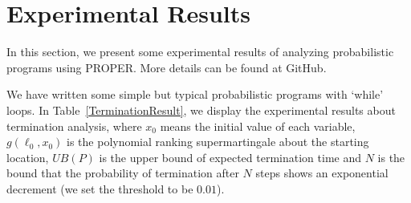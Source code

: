 \documentclass[sigconf,review, anonymous]{acmart}
\begin{document}
\section{Experimental Results}
In this section, we present some experimental results of analyzing probabilistic programs using PROPER. More details can be found at GitHub.


We have written some simple but typical probabilistic programs with `while' loops. In Table~\ref{TerminationResult}, we display the experimental results about termination analysis, where $x_0$ means the initial value of each variable, $g(\ell_0,x_0)$ is the polynomial ranking supermartingale about the starting location, $UB(P)$ is the upper bound of expected termination time and $N$ is the bound that the probability of termination after $N$ steps shows an exponential decrement (we set the threshold to  be $0.01$).
\end{document}
